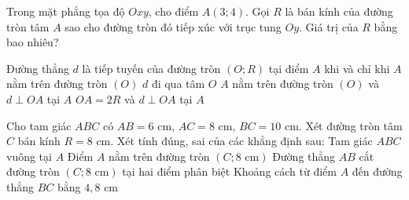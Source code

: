 \begin{bt}%
	Trong mặt phẳng tọa độ $Oxy$, cho điểm $A(3; 4)$. Gọi $R$ là bán kính của đường tròn tâm $A$ sao cho đường tròn đó tiếp xúc với trục tung $Oy$. Giá trị của $R$ bằng bao nhiêu?
\end{bt}


\begin{ex}%
	Đường thẳng $d$ là tiếp tuyến của đường tròn $(O; R)$ tại điểm $A$ khi và chỉ khi
	\choice
	{$A$ nằm trên đường tròn $(O)$}
	{$d$ đi qua tâm $O$}
	{\True $A$ nằm trên đường tròn $(O)$ và $d \perp OA$ tại $A$}
	{$OA = 2R$ và $d \perp OA$ tại $A$}
\end{ex}

\begin{ex}%
	Cho tam giác $ABC$ có $AB = 6\text{ cm}$, $AC = 8\text{ cm}$, $BC = 10\text{ cm}$. Xét đường tròn tâm $C$ bán kính $R = 8\text{ cm}$. Xét tính đúng, sai của các khẳng định sau:
	\choiceTF
	{\True Tam giác $ABC$ vuông tại $A$}
	{\True Điểm $A$ nằm trên đường tròn $(C; 8\text{ cm})$}
	{Đường thẳng $AB$ cắt đường tròn $(C; 8\text{ cm})$ tại hai điểm phân biệt}
	{\True Khoảng cách từ điểm $A$ đến đường thẳng $BC$ bằng $4{,}8\text{ cm}$}
\end{ex}

